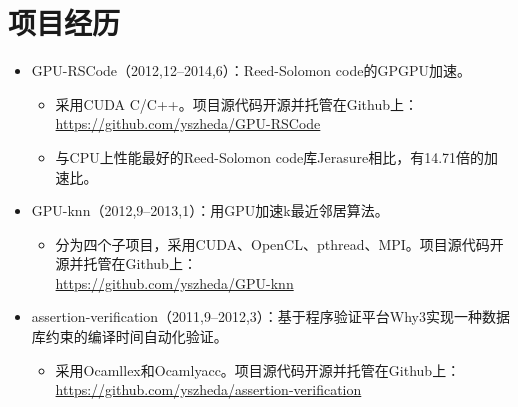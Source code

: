 \documentclass[letterpaper]{article}
\begin{document}
\section*{项目经历}
\begin{itemize}
    \item GPU-RSCode（2012,12--2014,6）：Reed-Solomon code的GPGPU加速。
        \begin{itemize}
            \item 采用CUDA C/C++。项目源代码开源并托管在Github上：\\
                \url{https://github.com/yszheda/GPU-RSCode}
            \item 与CPU上性能最好的Reed-Solomon code库Jerasure相比，有14.71倍的加速比。 
        \end{itemize}
    \item GPU-knn（2012,9--2013,1）：用GPU加速k最近邻居算法。
        \begin{itemize}
            \item 分为四个子项目，采用CUDA、OpenCL、pthread、MPI。项目源代码开源并托管在Github上：\\
                \url{https://github.com/yszheda/GPU-knn}
        \end{itemize}
    \item assertion-verification（2011,9--2012,3）：基于程序验证平台Why3实现一种数据库约束的编译时间自动化验证。
        \begin{itemize}
            \item 采用Ocamllex和Ocamlyacc。项目源代码开源并托管在Github上：\\
                \url{https://github.com/yszheda/assertion-verification}
        \end{itemize}

\end{itemize}
\end{document}
